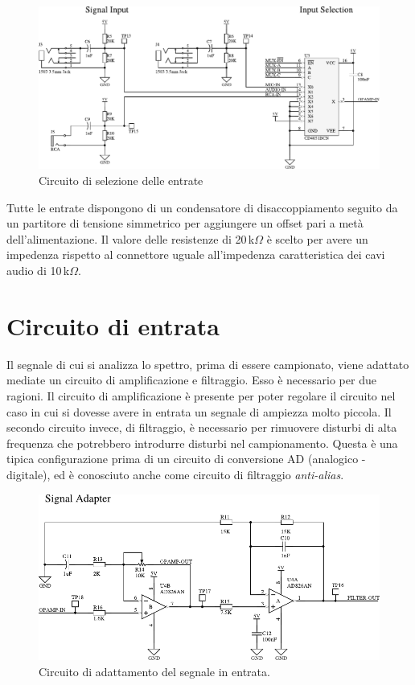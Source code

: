 \begin{figure}[H] \centering
    \includegraphics[width=.8\linewidth]{figures/circuits/input-selection.pdf}
    \caption{Circuito di selezione delle entrate \label{fig:input-selection}}
\end{figure}

Tutte le entrate dispongono di un condensatore di disaccoppiamento seguito da
un partitore di tensione simmetrico per aggiungere un offset pari a met\`a
dell'alimentazione. Il valore delle resistenze di 20\,k\(\Omega\) \`e scelto
per avere un impedenza rispetto al connettore uguale all'impedenza
caratteristica dei cavi audio di 10\,k\(\Omega\).

\section{Circuito di entrata}
Il segnale di cui si analizza lo spettro, prima di essere campionato, viene
adattato mediate un circuito di amplificazione e filtraggio. Esso \`e
necessario per due ragioni. Il circuito di amplificazione \`e presente per
poter regolare il circuito nel caso in cui si dovesse avere in entrata un
segnale di ampiezza molto piccola. Il secondo circuito invece, di filtraggio,
\`e necessario per rimuovere disturbi di alta frequenza che potrebbero
introdurre disturbi nel campionamento. Questa \`e una tipica configurazione
prima di un circuito di conversione AD (analogico - digitale), ed \`e
conosciuto anche come circuito di filtraggio \emph{anti-alias}.

\begin{figure}[H] \centering
    \includegraphics[width=.8\linewidth]{figures/circuits/filter-ampl.pdf}
    \caption[Circuito di adattamento del segnale]{
        Circuito di adattamento del segnale in entrata.
        \label{fig:filter-ampl-v1}
    }
\end{figure}

